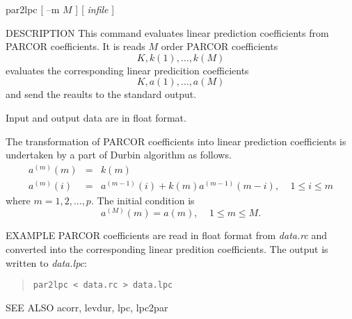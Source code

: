 
\begin{synopsis}
\item [par2lpc] [ --m $M$ ] [ {\em infile} ] 
\end{synopsis}

\begin{qsection}{DESCRIPTION}
This command evaluates linear prediction coefficients
from PARCOR coefficients.
It is reads $M$ order PARCOR coefficients
\begin{displaymath}
  K, k(1),\ldots, k(M)
\end{displaymath}
evaluates the corresponding linear predicition coefficients
\begin{displaymath}
  K, a(1),\ldots, a(M)
\end{displaymath}
and send the reaults to the standard output.
\par
Input and output data are in float format.
\par
The transformation of PARCOR coefficients into 
linear prediction coefficients is undertaken 
by a part of Durbin algorithm as follows.
\begin{eqnarray*} 
a^{(m)}(m) &=& k(m) \\
a^{(m)}(i) &=& a^{(m-1)}(i) + k(m) a^{(m-1)}(m-i), ~~~~~1\leq i \leq m
\end{eqnarray*}
where  $m=1, 2, \ldots, p$.
The initial condition is 
\begin{displaymath}
a^{(M)}(m) = a(m), ~~~~~1 \leq m \leq M.
\end{displaymath}
\end{qsection}

\begin{options}
\end{options}

\begin{qsection}{EXAMPLE}
PARCOR coefficients are read in float format from {\em data.rc}
and converted into the corresponding linear predition coefficients.
The output is written to {\em data.lpc}:
\begin{quote}
 \verb!par2lpc < data.rc > data.lpc!
\end{quote} 
\end{qsection}

\begin{qsection}{SEE ALSO}
acorr, levdur, lpc, lpc2par
\end{qsection}
